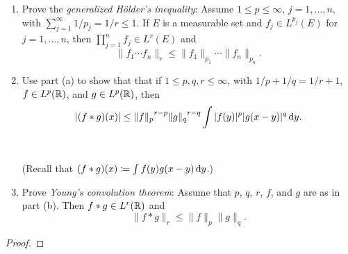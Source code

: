 \begin{problem}
\begin{enumerate}[label=(\alph*)]
\item Prove the \emph{generalized Hölder's inequality}: Assume
  $1\leq p\leq\infty$, $j=1,\dotsc,n$, with
  $\sum_{j=1}^\infty 1/p_j=1/r\leq 1$. If $E$ is a measurable set and
  $f_j\in L^{p_j}(E)$ for $j=1,\dotsc,n$, then
  $\prod_{j=1}^n f_j\in L^r(E)$ and
    \[
      \|f_1\dotsm f_n\|_r\leq\|f_1\|_{p_1}\dotsm\|f_n\|_{p_n}.
    \]
\item Use part (a) to show that that if $1\leq p,q,r\leq\infty$, with
  $1/p+1/q=1/r+1$, $f\in L^p(\mathbb{R})$, and $g\in L^p(\mathbb{R})$, then
\[
|(f*g)(x)|\leq{\|f\|_p}^{r-p}{\|g\|_q}^{r-q}\int|f(y)|^p|g(x-y)|^q\mathop{}\!\mathrm{d} y.
\]
\\\\
(Recall that $(f*g)(x)\coloneqq\int f(y)g(x-y)\mathop{}\!\mathrm{d} y$.)
\item Prove \emph{Young's convolution theorem}: Assume that $p$, $q$, $r$,
  $f$, and $g$ are as in part (b). Then $f*g\in L^r(\mathbb{R})$ and
  \[
    \|f*g\|_r\leq\|f\|_p\|g\|_q.
  \]
\end{enumerate}
\end{problem}
\begin{proof}
\end{proof}

